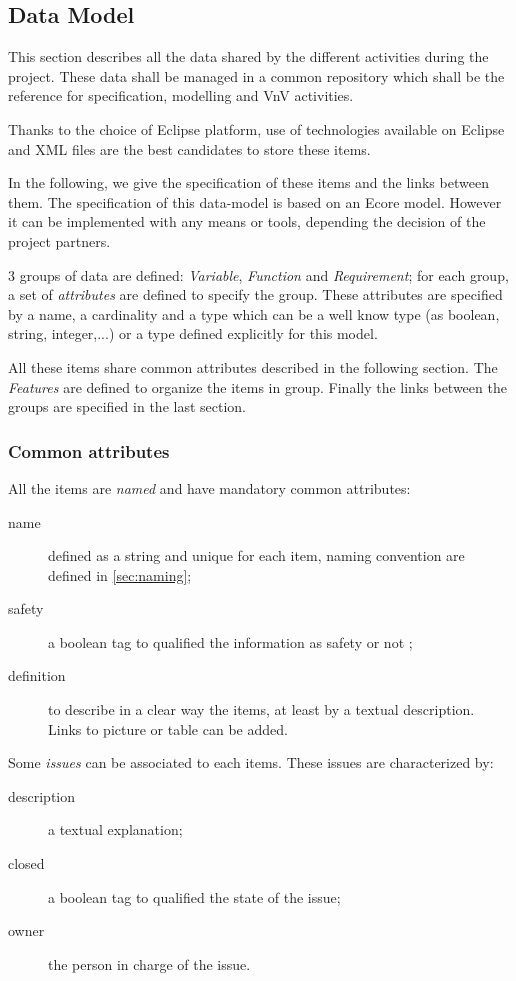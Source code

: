 \subsection{Data Model}
\label{sec:datamodel}

This section describes all the data shared by the different activities during the project.
These data shall be managed in a common repository which shall be the reference for specification, modelling and VnV activities.

Thanks to the choice of Eclipse platform, use of technologies available on Eclipse and XML files are the best candidates to store these items.

In the following, we give the specification of these items and the links between them. The specification of this data-model is based on an Ecore model. However it can be implemented with any means or tools, depending the decision of the project partners.

3 groups of data are defined: \emph{Variable}, \emph{Function} and \emph{Requirement}; for each group, a set of \emph{attributes} are defined to specify the group. These attributes are specified by a name, a cardinality and a type which can be a well  know type  (as boolean, string, integer,...) or a type defined explicitly for this model.

All these items share common attributes described in the following section. The \emph{Features} are defined to organize the items in group.
Finally the links between the groups are specified in the last section.


\subsubsection{Common attributes}

All the items are \textit{named} and have mandatory common attributes:
\begin{description}
\item [name] defined as a string and unique for each item, naming convention are defined in \ref{sec:naming};
\item[safety] a boolean tag to qualified the information as safety or not ;
\item[definition] to describe in a clear way the items, at least by a textual description. Links to picture or table can be added.
\end{description}

Some \textit{issues} can be associated to  each items. These issues are characterized by:
\begin{description}
\item[description] a textual explanation;
\item[closed] a boolean tag to qualified the state of the issue;
\item[owner] the person in charge of the issue.
\end{description}


